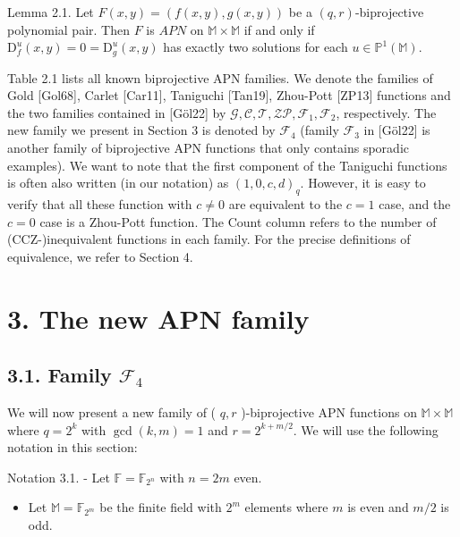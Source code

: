 \documentclass[10pt]{article}
\begin{document}
Lemma 2.1. Let $F(x, y)=(f(x, y), g(x, y))$ be a $(q, r)$-biprojective polynomial pair. Then $F$ is $A P N$ on $\mathbb{M} \times \mathbb{M}$ if and only if $\mathrm{D}_{f}^{u}(x, y)=0=\mathrm{D}_{g}^{u}(x, y)$ has exactly two solutions for each $u \in \mathbb{P}^{1}(\mathbb{M})$.

Table 2.1 lists all known biprojective APN families. We denote the families of Gold [Gol68], Carlet [Car11], Taniguchi [Tan19], Zhou-Pott [ZP13] functions and the two families contained in [Göl22] by $\mathcal{G}, \mathcal{C}, \mathcal{T}, \mathcal{Z} \mathcal{P}, \mathcal{F}_{1}, \mathcal{F}_{2}$, respectively. The new family we present in Section 3 is denoted by $\mathcal{F}_{4}$ (family $\mathcal{F}_{3}$ in [Göl22] is another family of biprojective APN functions that only contains sporadic examples). We want to note that the first component of the Taniguchi functions is often also written (in our notation) as $(1,0, c, d)_{q}$. However, it is easy to verify that all these function with $c \neq 0$ are equivalent to the $c=1$ case, and the $c=0$ case is a Zhou-Pott function. The Count column refers to the number of (CCZ-)inequivalent functions in each family. For the precise definitions of equivalence, we refer to Section 4.

\section*{3. The new APN family}
\subsection*{3.1. Family $\mathcal{F}_{4}$}
We will now present a new family of ( $q, r$ )-biprojective APN functions on $\mathbb{M} \times \mathbb{M}$ where $q=2^{k}$ with $\operatorname{gcd}(k, m)=1$ and $r=2^{k+m / 2}$. We will use the following notation in this section:

Notation 3.1. - Let $\mathbb{F}=\mathbb{F}_{2^{n}}$ with $n=2 m$ even.

\begin{itemize}
  \item Let $\mathbb{M}=\mathbb{F}_{2^{m}}$ be the finite field with $2^{m}$ elements where $m$ is even and $m / 2$ is odd.
\end{itemize}
\end{document}
